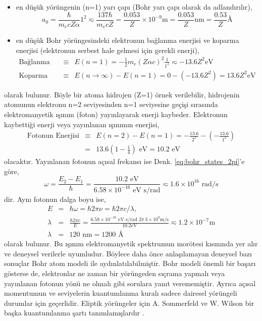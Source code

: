 \documentclass[a4paper,12pt, twoside]{article}
\begin{document}
\begin{itemize}
\item en düşük yörüngenin (n=1) yarı çapı (Bohr yarı çapı olarak da adlandırılır),
\begin{equation}
a_0 = \frac{\hbar}{m_e c Z \alpha} 1^2 \eqsim \frac{137\hbar}{m_e c Z} = \frac{0.053}{Z}\times 10^{-9} \text{m} = \frac{0.053}{Z} \text{nm} = \frac{0.53}{Z} \text{\AA}
\label{eq:bohr_radius}
\end{equation}

\item en düşük Bohr yörüngesindeki elektronun bağlanma enerjisi ve koparma enerjisi (elektronun serbest hale gelmesi için gerekli enerji),
\begin{eqnarray}
\text{Bağlanma Enerjisi} &\equiv& E(n=1) = -\frac{1}{2}m_e (Z \alpha c)^2 \frac{1}{1^2} \eqsim -13.6 Z^2 \text{eV} \\
\text{Koparma Enerjisi} &\equiv& E(n\rightarrow\infty) - E(n=1) = 0 - (-13.6 Z^2) = 13.6 Z^2 \text{eV}
\label{eq:bindingEnergy}
\end{eqnarray}
\end{itemize}
olarak bulunur. Böyle bir atoma hidrojen (Z=1) örnek verilebilir, hidrojenin atomunun elektronu n=2 seviyesinden n=1 seviyesine geçişi sırasında elektromanyetik ışınım (foton) yayınlayarak enerji kaybeder. Elektronun kaybettiği enerji veya yayınlanan ışınımın enerjisi,
\begin{eqnarray}
\text{Fotonun Enerjisi} &\equiv& E(n=2) - E(n=1) 
= -\frac{13.6}{2^2} - (-\frac{13.6}{1^2}) \nonumber \\ 
&=&  13.6 (1-\frac{1}{4}) \text{ eV} = 10.2 \text{ eV}
\label{eq:fotonEnergy}
\end{eqnarray}
olacaktır. Yayınlanan fotonun açısal frekansı ise Denk. \ref{eq:bohr_states_2pi}'e göre,
\begin{equation*}
\omega = \frac{E_2 - E_1}{\hbar} = \frac{10.2 \text{ eV}}{6.58\times 10^{-16} \text{ eV s/rad}} \eqsim 1.6 \times 10^{16} \text{ rad/s}
\end{equation*}
dir. Aynı fotonun dalga boyu ise,
\begin{eqnarray*}
E &=& \hbar \omega = \hbar 2\pi \nu = \hbar 2\pi c/\lambda, \\
\lambda &=& \frac{\hbar 2\pi c}{E} = 
\frac{6.58\times 10^{-16} \text{ eV s/rad } 2\pi\,3\times 10^8 \text{m/s}}{10.2 \text{eV}}\eqsim 1.2\times 10^{-7} \text{m}\\
\lambda &=& 120 \text{ nm} = 1200 \text{ \AA} 
\end{eqnarray*}
olarak bulunur. Bu ışınım elektromanyetik spektrumun morötesi kısmında yer alır ve deneysel verilerle uyumludur. Böylece daha önce anlaşılamayan deneysel bazı sonuçlar Bohr atom modeli ile aydınlatılabilmiştir. Bohr modeli önemli bir başarı gösterse de, elektronlar ne zaman bir yörüngeden sıçrama yapmalı veya yayınlanan fotonun yönü ne olmalı gibi sorulara yanıt verememiştir. Ayrıca açısal momentumun ve seviyelerin kuantumlanma kuralı sadece dairesel yörüngeli durumlar için geçerlidir. Eliptik yörüngeler için A. Sommerfeld ve W. Wilson bir başka kuantumlanma şartı tanımlamışlardır \cite{book:Gasiorowicz, book:EisbergResnick}. 
\end{document}
